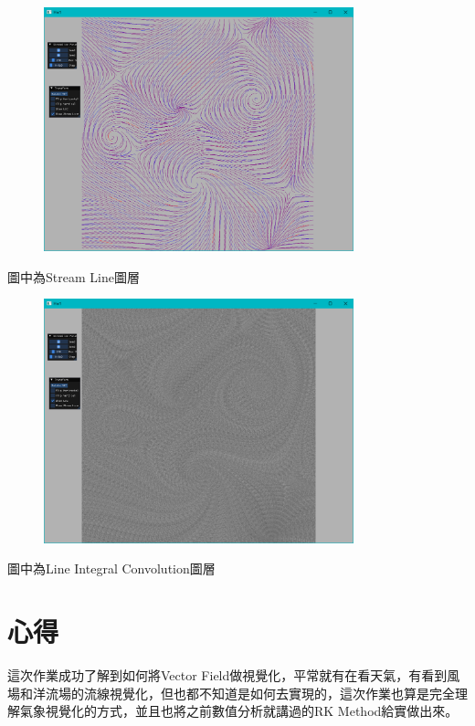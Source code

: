 \documentclass[a4paper,12pt]{article}
\begin{document}
\begin{figure}[h]
    \centering
    \includegraphics[width=0.8\textwidth]{img/img2.png}
\end{figure}
圖中為Stream Line圖層

\begin{figure}[h]
    \centering
    \includegraphics[width=0.8\textwidth]{img/img3.png}
\end{figure}
圖中為Line Integral Convolution圖層



\section{心得}
    這次作業成功了解到如何將Vector Field做視覺化，平常就有在看天氣，有看到風場和洋流場的流線視覺化，但也都不知道是如何去實現的，這次作業也算是完全理解氣象視覺化的方式，並且也將之前數值分析就講過的RK Method給實做出來。
\end{document}
